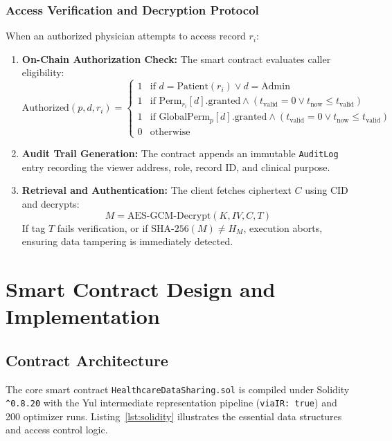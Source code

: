 \documentclass[11pt,a4paper]{article}
\begin{document}
\subsubsection{Access Verification and Decryption Protocol}
When an authorized physician attempts to access record $r_i$:
\begin{enumerate}
    \item \textbf{On-Chain Authorization Check:} The smart contract evaluates caller eligibility:
    \begin{equation}
        \text{Authorized}(p, d, r_i) = \begin{cases}
            1 & \text{if } d = \text{Patient}(r_i) \lor d = \text{Admin} \\
            1 & \text{if } \text{Perm}_{r_i}[d].\text{granted} \land (t_{\text{valid}} = 0 \lor t_{\text{now}} \le t_{\text{valid}}) \\
            1 & \text{if } \text{GlobalPerm}_{p}[d].\text{granted} \land (t_{\text{valid}} = 0 \lor t_{\text{now}} \le t_{\text{valid}}) \\
            0 & \text{otherwise}
        \end{cases}
    \end{equation}
    \item \textbf{Audit Trail Generation:} The contract appends an immutable \texttt{AuditLog} entry recording the viewer address, role, record ID, and clinical purpose.
    \item \textbf{Retrieval and Authentication:} The client fetches ciphertext $C$ using $\text{CID}$ and decrypts:
    \begin{equation}
        M = \text{AES-GCM-Decrypt}(K, IV, C, T)
    \end{equation}
    If tag $T$ fails verification, or if $\text{SHA-256}(M) \ne H_M$, execution aborts, ensuring data tampering is immediately detected.
\end{enumerate}

\section{Smart Contract Design and Implementation}

\subsection{Contract Architecture}
The core smart contract \texttt{HealthcareDataSharing.sol} is compiled under Solidity \texttt{\^{}0.8.20} with the Yul intermediate representation pipeline (\texttt{viaIR: true}) and 200 optimizer runs. Listing~\ref{lst:solidity} illustrates the essential data structures and access control logic.
\end{document}
